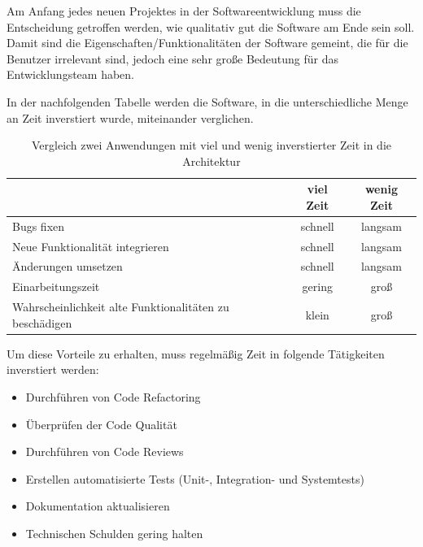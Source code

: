 

    Am Anfang jedes neuen Projektes in der Softwareentwicklung muss die Entscheidung getroffen werden, wie qualitativ gut die Software am Ende sein soll.
    Damit sind die Eigenschaften/Funktionalitäten der Software gemeint, die für die Benutzer irrelevant sind, jedoch eine sehr große Bedeutung 
    für das Entwicklungsteam haben.
    
    In der nachfolgenden Tabelle werden die Software, 
    in die unterschiedliche Menge an Zeit inverstiert wurde, miteinander verglichen.

    \begin{table}[h!]
        \centering
    \begin{tabular}{ |l|c|c| } 
        \hline
                                                                & viel Zeit & wenig Zeit \\ 
                                                                \hline
        Bugs fixen                                              & schnell       & langsam \\ 
        Neue Funktionalität integrieren                         & schnell       & langsam \\
        Änderungen umsetzen                                     & schnell       & langsam \\ 
        Einarbeitungszeit                                       & gering        & groß \\
        Wahrscheinlichkeit alte Funktionalitäten zu beschädigen & klein       & groß \\
        \hline

       \end{tabular}
       \caption{Vergleich zwei Anwendungen mit viel und wenig inverstierter Zeit in die Architektur}
       \label{tab:compareGoodAndBadArchitecture}
    \end{table}

    Um diese Vorteile zu erhalten, muss regelmäßig Zeit in folgende Tätigkeiten inverstiert werden:
    \begin{itemize}
        \item Durchführen von Code Refactoring
        \item Überprüfen der Code Qualität
        \item Durchführen von Code Reviews
        \item Erstellen automatisierte Tests (Unit-, Integration- und Systemtests)
        \item Dokumentation aktualisieren
        \item Technischen Schulden gering halten
    \end{itemize}

